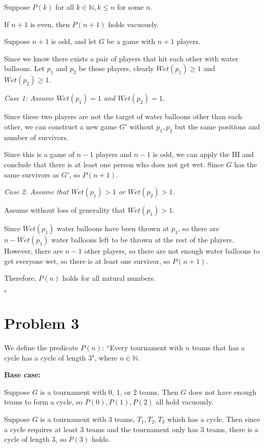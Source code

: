 \documentclass[12pt]{article}
\newcommand{\N}{\mathbb{N}}
\begin{document}
Suppose $P(k)$ for all $k \in \N, k \leq n$ for some $n$. 

If $n + 1$ is even, then $P(n + 1)$ holds vacuously.

Suppose $n + 1$ is odd, and let $G$ be a game with $n + 1$ players.
  
Since we know there exists a pair of players that hit each other with water balloons. Let $p_1$ and $p_2$ be those players, clearly $Wet(p_1) \geq 1$ and $Wet(p_2) \geq 1$.

\noindent \textit{Case 1: Assume $Wet(p_1) = 1$ and $Wet(p_2) = 1$.}

Since these two players are not the target of water balloons other than each other, we can construct a new game $G'$ without $p_1, p_2$ but the same positions and number of survivors.

Since this is a game of $n - 1$ players and $n - 1$ is odd, we can apply the IH and conclude that there is at least one person who does not get wet. Since $G$ has the same survivors as $G'$, so $P(n + 1).$

\noindent \textit{Case 2. Assume that $Wet(p_1) > 1$ or $Wet(p_2) > 1$.}

Assume without loss of generality that $Wet(p_1) > 1$.

Since $Wet(p_1)$ water balloons have been thrown at $p_1$, so there are $n - Wet(p_1)$ water balloons left to be thrown at the rest of the players. However, there are $n - 1$ other players, so there are not enough water balloons to get everyone wet, so there is at least one survivor, so $P(n + 1)$.

Therefore, $P(n)$ holds for all natural numbers.

\hfill $\square$

\newpage
\section*{Problem 3}

We define the predicate $P(n)$: ``Every tournament with $n$ teams that has a cycle has a cycle of length $3$", where $n \in \N$.

\noindent \textbf{Base case:}

Suppose $G$ is a tournament with 0, 1, or 2 teams. Then $G$ does not have enough teams to form a cycle, so $P(0), P(1), P(2)$ all hold vacuously.

Suppose $G$ is a tournament with 3 teams, $T_1, T_2, T_3$ which has a cycle. Then since a cycle requires at least 3 teams and the tournament only has 3 teams, there is a cycle of length 3, so $P(3)$ holds.
\end{document}
